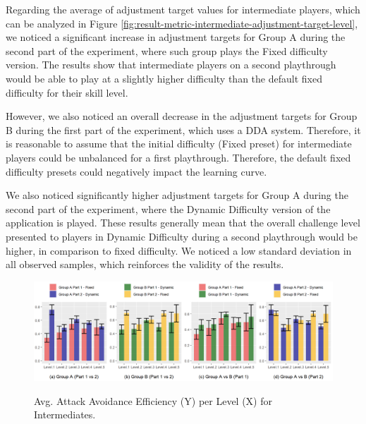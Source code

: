 Regarding the average of adjustment target values for intermediate players, which can be analyzed in Figure \ref{fig:result-metric-intermediate-adjustment-target-level}, we noticed a significant increase in adjustment targets for Group A during the second part of the experiment, where such group plays the Fixed difficulty version. The results show that intermediate players on a second playthrough would be able to play at a slightly higher difficulty than the default fixed difficulty for their skill level.

However, we also noticed an overall decrease in the adjustment targets for Group B during the first part of the experiment, which uses a DDA system. Therefore, it is reasonable to assume that the initial difficulty (Fixed preset) for intermediate players could be unbalanced for a first playthrough. Therefore, the default fixed difficulty presets could negatively impact the learning curve.

We also noticed significantly higher adjustment targets for Group A during the second part of the experiment, where the Dynamic Difficulty version of the application is played. These results generally mean that the overall challenge level presented to players in Dynamic Difficulty during a second playthrough would be higher, in comparison to fixed difficulty. We noticed a low standard deviation in all observed samples, which reinforces the validity of the results.

\begin{figure}[!ht]
    \begin{center}
    \caption{Avg. Attack Avoidance Efficiency (Y) per Level (X) for Intermediates.}
        \includegraphics[width=\textwidth]{figures/attack_avoidance_efficiency-intermediate_players.png}
        \label{fig:result-metric-intermediates-attack-avoidance-efficiency}
    \end{center}
\end{figure}

